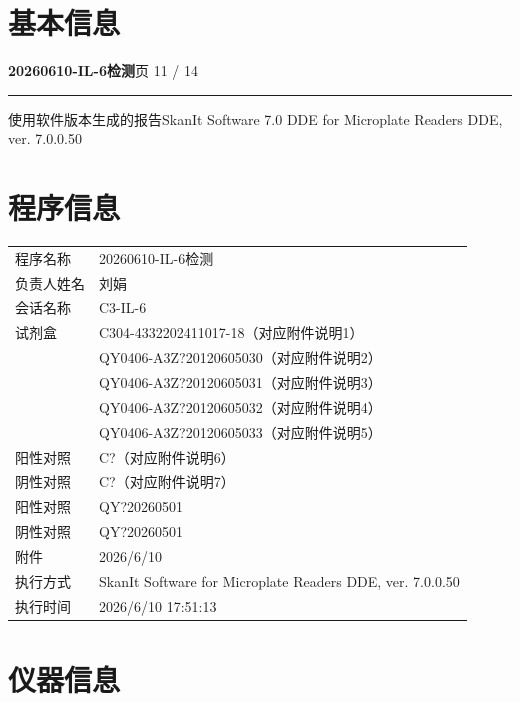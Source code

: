 \documentclass[UTF8,10pt,a4paper,fontset=fandol]{ctexart}
\begin{document}
\vspace{1em}

\section*{基本信息}


\newpage

\noindent\textbf{20260610-IL-6检测}\hfill 页 11 / 14

\noindent\rule{\linewidth}{0.4pt}

\smallskip
\noindent 使用软件版本生成的报告\quad SkanIt Software 7.0 DDE for Microplate Readers DDE, ver. 7.0.0.50

\section*{程序信息}

\begin{tabular}{@{}p{3.2cm}p{10.5cm}@{}}
程序名称 & 20260610-IL-6检测\\
负责人姓名 & 刘娟\\
会话名称 & C3-IL-6\\
试剂盒 & C304-4332202411017-18（对应附件说明1）\\
 & QY0406-A3Z?20120605030（对应附件说明2）\\
 & QY0406-A3Z?20120605031（对应附件说明3）\\
 & QY0406-A3Z?20120605032（对应附件说明4）\\
 & QY0406-A3Z?20120605033（对应附件说明5）\\
阳性对照 & C?（对应附件说明6）\\
阴性对照 & C?（对应附件说明7）\\
阳性对照 & QY?20260501\\
阴性对照 & QY?20260501\\
附件 & 2026/6/10\\
执行方式 & SkanIt Software for Microplate Readers DDE, ver. 7.0.0.50\\
执行时间 & 2026/6/10 17:51:13\\
\end{tabular}


\section*{仪器信息}
\end{document}
